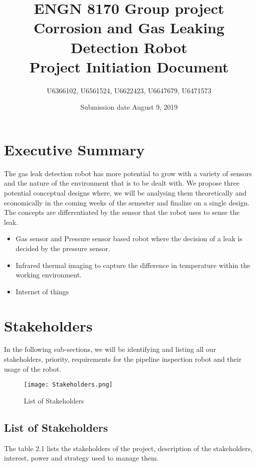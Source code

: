 \documentclass[a4paper]{article}
\title{ENGN 8170 Group project\\ Corrosion and Gas Leaking Detection Robot\\ Project Initiation Document}
\author{U6366102, U6561524, U6622423, U6647679, U6471573}
\date{Submission date August 9, 2019}
\begin{document}
\maketitle
\newpage
\tableofcontents
\newpage
{}
\section{Executive Summary}
The gas leak detection robot has more potential to grow with a variety of sensors and the nature of the environment that is to be dealt with. We propose three potential conceptual designs where, we will be analysing them theoretically and economically in the coming weeks of the semester and finalize on a single design. The concepts are differentiated by the sensor that the robot uses to sense the leak.
\begin{itemize}
    \item {Gas sensor and Pressure sensor based robot where the decision of a leak is decided by the pressure sensor.}
    \item{Infrared thermal imaging to capture the difference in temperature within the working environment.}
    \item{Internet of things} %
\end{itemize}
\section{Stakeholders}
In the following sub-sections, we will be identifying and listing all our stakeholders, priority, requirements for the pipeline inspection robot and their usage of the robot.
\begin{figure}[htbp]
    \centerline{\texttt{[image: Stakeholders.png]}}
    \caption{List of Stakeholders}
    \label{fig:2.1}
\end{figure}
\subsection{List of Stakeholders}
The table 2.1 lists the stakeholders of the project, description of the stakeholders, interest, power and strategy used to manage them.
\end{document}
